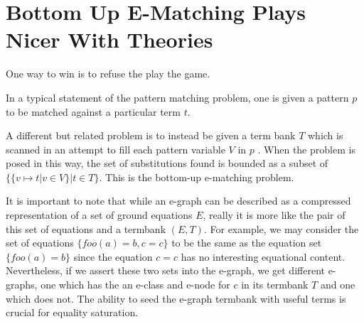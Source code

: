 \documentclass[sigconf]{acmart}
\begin{document}














\section {Bottom Up E-Matching Plays Nicer With Theories}

One way to win is to refuse the play the game.

In a typical statement of the pattern matching problem, one is given a  pattern $p$ to be matched against a particular term $t$. %

A different but related problem is to instead be given a term bank $T$ which is scanned in an attempt to fill each pattern variable $V$ in $p$ \cite{bottomup}. When the problem is posed in this way, the set of substitutions found is bounded as a subset of $\{\{ v \mapsto t | v \in V \} | t \in T \}$. This is the bottom-up e-matching problem. %

It is important to note that while an e-graph can be described as a compressed representation of a set of ground equations $E$, really it is more like the pair of this set of equations and a termbank $(E, T)$. For example, we may consider the set of equations $\{foo(a) = b, c = c\}$ to be the same as the equation set $\{foo(a) = b\}$ since the equation $c = c$ has no interesting equational content. Nevertheless, if we assert these two sets into the e-graph, we get different e-graphs, one which has the an e-class and e-node for $c$ in its termbank $T$ and one which does not. The ability to seed the e-graph termbank with useful terms is crucial for equality saturation.
\end{document}
